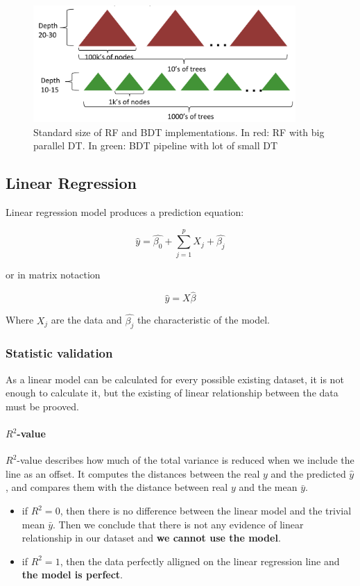\begin{figure}[H]%
 \centering
 \includegraphics[width=10cm]{./img/07/RF_BT.png}
 \caption{\label{pic:RF_BT.} Standard size of RF and BDT implementations.
 In red: RF with big parallel DT. In green: BDT pipeline with lot of small DT}
\end{figure}


\subsection{Linear Regression}

Linear regression model produces a prediction equation:

$$
\hat{y} = \hat{\beta_0} + \sum\limits_{j=1}^p  X_j + \hat{ \beta_j}
$$

or in matrix notaction

$$
\hat{y} =X \hat{ \beta}
$$

Where $X_j$ are the data and $\hat{\beta_j}$ the characteristic of the model. 

\subsubsection{Statistic validation}

As a linear model can be calculated for every possible existing dataset, it is not enough to calculate it, but the existing of linear relationship between the data must be prooved.

\paragraph{$R^2$-value}

$R^2$-value describes how much of the total variance is reduced when we include the line as an offset. It computes the distances between the real $y$ and the predicted $\hat{y}$, and compares them with the distance between real $y$ and the mean $\bar{y}$.

\begin{itemize}
\item if $R^2 = 0$, then there is no difference between the linear model and the trivial mean $\bar{y}$. Then we conclude that there is not any evidence of linear relationship in our dataset and \textbf{we cannot use the model}.
\item if $R^2 = 1$, then the data perfectly alligned on the linear regression line and \textbf{the model is perfect}.
\end{itemize}

